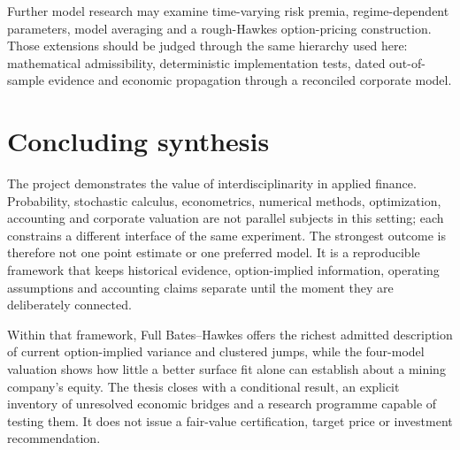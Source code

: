 Further model research may examine time-varying risk premia, regime-dependent
parameters, model averaging and a rough-Hawkes option-pricing construction.
Those extensions should be judged through the same hierarchy used here:
mathematical admissibility, deterministic implementation tests, dated
out-of-sample evidence and economic propagation through a reconciled corporate
model.

\section*{Concluding synthesis}

The project demonstrates the value of interdisciplinarity in applied finance.
Probability, stochastic calculus, econometrics, numerical methods,
optimization, accounting and corporate valuation are not parallel subjects in
this setting; each constrains a different interface of the same experiment.
The strongest outcome is therefore not one point estimate or one preferred
model. It is a reproducible framework that keeps historical evidence,
option-implied information, operating assumptions and accounting claims
separate until the moment they are deliberately connected.

Within that framework, Full Bates--Hawkes offers the richest admitted
description of current option-implied variance and clustered jumps, while the
four-model valuation shows how little a better surface fit alone can establish
about a mining company's equity. The thesis closes with a conditional result,
an explicit inventory of unresolved economic bridges and a research programme
capable of testing them. It does not issue a fair-value certification, target
price or investment recommendation.
